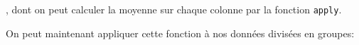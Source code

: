 \noindent, dont on peut calculer la moyenne sur chaque colonne par la fonction \texttt{apply}.

\begin{knitrout}
\color{fgcolor}\begin{kframe}
\begin{flushleft}
\ttfamily\noindent
{}\hlassignement{\usebox{\hlnormalsizeboxlessthan}-}{\ }\hlkeyword{(}\hlkeyword{)}{\ }\hlkeyword{(}\hlkeyword{[}\hlkeyword{,}{\ }\hlkeyword{(}\hlkeyword{:}\hlkeyword{(}\hlkeyword{)}\hlkeyword{)}\hlkeyword{]}\hlkeyword{,}{\ }\hlkeyword{,}{\ }\hlkeyword{,}{\ }\hlargument{=}{\ }\hlkeyword{)}\mbox{}
\normalfont
\end{flushleft}
\end{kframe}
\end{knitrout}


On peut maintenant appliquer cette fonction à nos données divisées en groupes:

